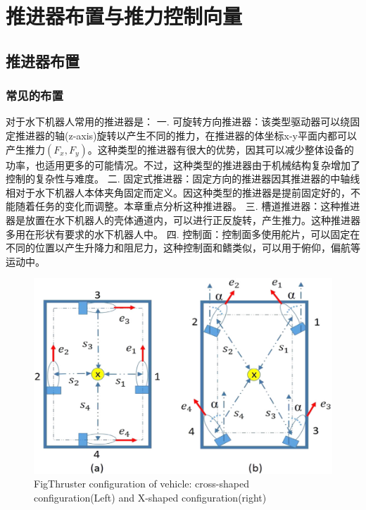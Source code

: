 \section{推进器布置与推力控制向量 }
\label{2_3}
\subsection{推进器布置 }
\subsubsection{常见的布置 }

对于水下机器人常用的推进器是：
一. 可旋转方向推进器：该类型驱动器可以绕固定推进器的轴(z-axis)旋转以产生不同的推力，在推进器的体坐标x-y平面内都可以产生推力$(F_x,F_y)$。这种类型的推进器有很大的优势，因其可以减少整体设备的功率，也适用更多的可能情况。不过，这种类型的推进器由于机械结构复杂增加了控制的复杂性与难度。
二. 固定式推进器：固定方向的推进器因其推进器的中轴线相对于水下机器人本体夹角固定而定义。因这种类型的推进器是提前固定好的，不能随着任务的变化而调整。本章重点分析这种推进器。
三. 槽道推进器：这种推进器是放置在水下机器人的壳体通道内，可以进行正反旋转，产生推力。这种推进器多用在形状有要求的水下机器人中。
四. 控制面：控制面多使用舵片，可以固定在不同的位置以产生升降力和阻尼力，这种控制面和鳍类似，可以用于俯仰，偏航等运动中。

\begin{figure}[h]
    \centering
        \includegraphics[width=12cm]{figure/chap2/configure.jpg}
        \label{fig:chap2:F7}
         {Fig}{Thruster configuration of vehicle: cross-shaped configuration(Left) and X-shaped configuration(right)}
\end{figure}

